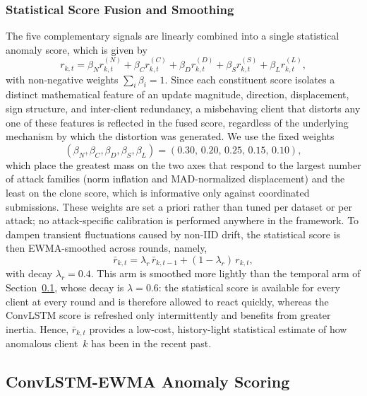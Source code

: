 \documentclass[journal]{IEEEtran}
\begin{document}
\subsubsection{Statistical Score Fusion and Smoothing}
The five complementary signals are linearly combined into a single statistical anomaly score, which is given by
\begin{equation}
r_{k,t} = \beta_N r_{k,t}^{(N)} + \beta_C r_{k,t}^{(C)} + \beta_D r_{k,t}^{(D)} + \beta_S r_{k,t}^{(S)} + \beta_L r_{k,t}^{(L)},
\label{eq:stat_score}
\end{equation}
with non-negative weights $\sum_i \beta_i = 1$. Since each constituent score isolates a distinct mathematical feature of an update magnitude, direction, displacement, sign structure, and inter-client redundancy, a misbehaving client that distorts any one of these features is reflected in the fused score, regardless of the underlying mechanism by which the distortion was generated. We use the fixed weights
\begin{equation}
(\beta_N, \beta_C, \beta_D, \beta_S, \beta_L) = (0.30,\, 0.20,\, 0.25,\, 0.15,\, 0.10),
\label{eq:beta_values}
\end{equation}
which place the greatest mass on the two axes that respond to the largest number of attack families (norm inflation and MAD-normalized displacement) and the least on the clone score, which is informative only against coordinated submissions. These weights are set a priori rather than tuned per dataset or per attack; no attack-specific calibration is performed anywhere in the framework. To dampen transient fluctuations caused by non-IID drift, the statistical score is then EWMA-smoothed across rounds, namely,
\begin{equation}
\bar r_{k,t} = \lambda_r\,\bar r_{k,t-1} + (1-\lambda_r)\,r_{k,t},
\label{eq:stat_ewma}
\end{equation}
with decay $\lambda_r = 0.4$. This arm is smoothed more lightly than the temporal arm of Section~\ref{sec:convlstm_ewma}, whose decay is $\lambda = 0.6$: the statistical score is available for every client at every round and is therefore allowed to react quickly, whereas the ConvLSTM score is refreshed only intermittently and benefits from greater inertia. Hence, $\bar r_{k,t}$ provides a low-cost, history-light statistical estimate of how anomalous client~$k$ has been in the recent past.

\subsection{ConvLSTM-EWMA Anomaly Scoring}
\label{sec:convlstm_ewma}
\end{document}
